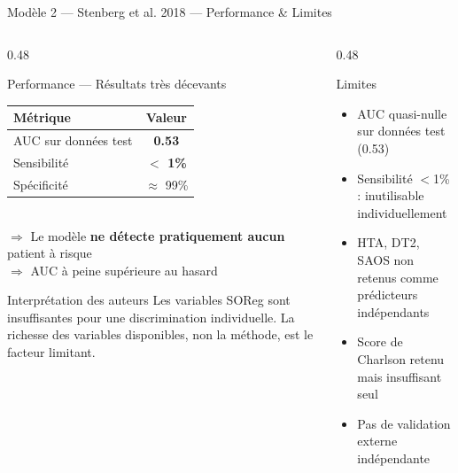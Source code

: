 \documentclass[aspectratio=169]{beamer}
\newcommand{\tightlist}{%
  \setlength{\itemsep}{1pt}\setlength{\parskip}{0pt}%
  \setlength{\parsep}{0pt}\setlength{\topsep}{2pt}}
\begin{document}
\begin{frame}[shrink=5]{Modèle 2 --- Stenberg et al. 2018 --- Performance \& Limites}
  \begin{columns}[T]
    \begin{column}{0.48\textwidth}
      \begin{alertblock}{Performance --- Résultats très décevants}
        \footnotesize
        \begin{tabular}{lc}
          \toprule
          \textbf{Métrique} & \textbf{Valeur} \\
          \midrule
          AUC sur données test & \textcolor{rougealerte}{\textbf{0.53}} \\
          Sensibilité & \textcolor{rougealerte}{\textbf{$<$ 1\%}} \\
          Spécificité & $\approx$ 99\% \\
          \bottomrule
        \end{tabular}
        \vspace{4pt}\\
        $\Rightarrow$ Le modèle \textbf{ne détecte pratiquement aucun} patient à risque\\
        $\Rightarrow$ AUC à peine supérieure au hasard
      \end{alertblock}
      \vspace{0.2em}
      \begin{block}{Interprétation des auteurs}
        \footnotesize
        Les variables SOReg sont insuffisantes pour une discrimination individuelle. La richesse des variables disponibles, non la méthode, est le facteur limitant.
      \end{block}
    \end{column}
    \begin{column}{0.48\textwidth}
      \begin{alertblock}{Limites}
        \footnotesize\tightlist
        \begin{itemize}\tightlist
          \item AUC quasi-nulle sur données test (0.53)
          \item Sensibilité $<$1\% : inutilisable individuellement
          \item HTA, DT2, SAOS non retenus comme prédicteurs indépendants
          \item Score de Charlson retenu mais insuffisant seul
          \item Pas de validation externe indépendante

\end{itemize}
\end{alertblock}
\end{column}
\end{columns}
\end{frame}
\end{document}
